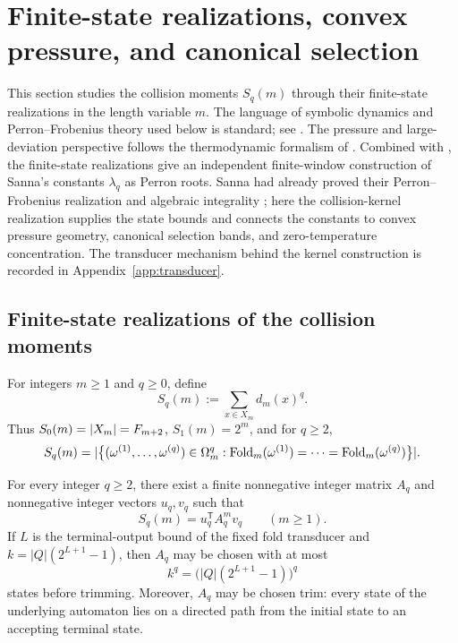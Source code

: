 \section{Finite-state realizations, convex pressure, and canonical selection}
\label{sec:moment-kernel}

This section studies the collision moments \(S_q(m)\) through their finite-state
realizations in the length variable \(m\).  The language of symbolic dynamics
and Perron--Frobenius theory used below is standard; see
\cite{LindMarcus1995,Seneta2006}.  The pressure and large-deviation
perspective follows the thermodynamic formalism of
\cite{DemboZeitouni2010}.  Combined with , the
finite-state realizations give an independent finite-window construction of
Sanna's constants \(\lambda_q\) as Perron roots.  Sanna had already proved
their Perron--Frobenius realization and algebraic integrality
\cite[Thm.~1]{Sanna2025}; here the collision-kernel realization supplies the
state bounds and connects the constants to convex pressure geometry,
canonical selection bands, and zero-temperature concentration.  The transducer
mechanism behind the kernel construction is recorded in
Appendix~\ref{app:transducer}.

\subsection{Finite-state realizations of the collision moments}

\begin{definition}
\label{def:collision-moments}
For integers \(m\ge 1\) and \(q\ge 0\), define
\[
  S_q(m):=\sum_{x\in X_m} d_m(x)^q.
\]
Thus \(S_0(m)=\lvert X_m \rvert=F_{m+2}\), \(S_1(m)=2^m\), and for \(q\ge 2\),
\[
  S_q(m)
  =
  \lvert \bigl\{(\omega^{(1)},\dots,\omega^{(q)})\in\Omega_m^q:
  \mathrm{Fold}_m(\omega^{(1)})=\cdots=\mathrm{Fold}_m(\omega^{(q)})\bigr\} \rvert.
\]
\end{definition}

\begin{theorem}
\label{thm:collision-kernel}
For every integer \(q\ge 2\), there exist a finite nonnegative integer matrix
\(A_q\) and nonnegative integer vectors \(u_q,v_q\) such that
\[
  S_q(m)=u_q^{\mathsf T}A_q^m v_q
  \qquad (m\ge 1).
\]
If \(L\) is the terminal-output bound of the fixed fold transducer and
\(k=|Q|(2^{L+1}-1)\), then \(A_q\) may be chosen with at most
\[
  k^q=\bigl(|Q|(2^{L+1}-1)\bigr)^q
\]
states before trimming.
Moreover, \(A_q\) may be chosen trim: every state of the underlying automaton
lies on a directed path from the initial state to an accepting terminal state.
\end{theorem}

